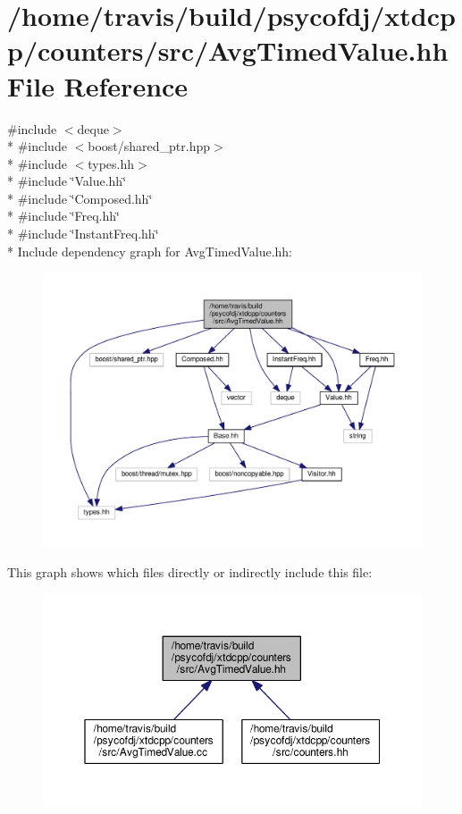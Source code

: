 \hypertarget{AvgTimedValue_8hh}{\section{/home/travis/build/psycofdj/xtdcpp/counters/src/\-Avg\-Timed\-Value.hh File Reference}
\label{AvgTimedValue_8hh}
}
{\ttfamily \#include $<$deque$>$}\\*
{\ttfamily \#include $<$boost/shared\-\_\-ptr.\-hpp$>$}\\*
{\ttfamily \#include $<$types.\-hh$>$}\\*
{\ttfamily \#include \char`\"{}Value.\-hh\char`\"{}}\\*
{\ttfamily \#include \char`\"{}Composed.\-hh\char`\"{}}\\*
{\ttfamily \#include \char`\"{}Freq.\-hh\char`\"{}}\\*
{\ttfamily \#include \char`\"{}Instant\-Freq.\-hh\char`\"{}}\\*
Include dependency graph for Avg\-Timed\-Value.\-hh\-:
\nopagebreak
\begin{figure}[H]
\begin{center}
\leavevmode
\includegraphics[width=350pt]{AvgTimedValue_8hh__incl}
\end{center}
\end{figure}
This graph shows which files directly or indirectly include this file\-:
\nopagebreak
\begin{figure}[H]
\begin{center}
\leavevmode
\includegraphics[width=350pt]{AvgTimedValue_8hh__dep__incl}
\end{center}
\end{figure}
